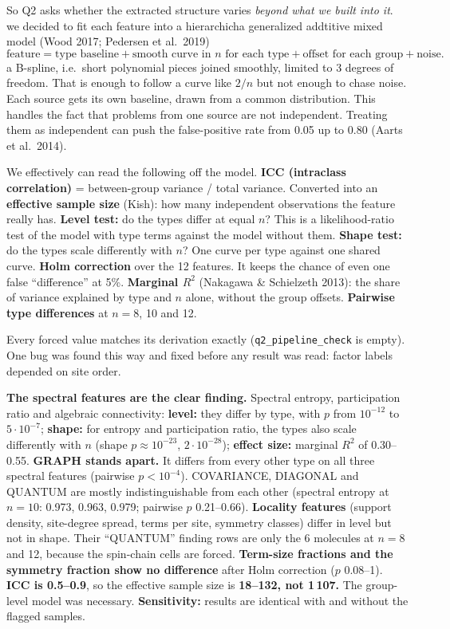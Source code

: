\documentclass[10pt,a4paper]{article}
\begin{document}
So Q2 asks whether the extracted structure varies \emph{beyond what we built
into it}. we decided to fit each feature into a hierarchicha generalized
addtitive mixed model (Wood 2017; Pedersen et al.\ 2019)
\[
\text{feature} = \text{type baseline} + \text{smooth curve in } n \text{ for each type} + \text{offset for each group} + \text{noise}.
\]
a B-spline, i.e.\ short polynomial pieces joined smoothly, limited to 3
degrees of freedom. That is enough to follow a curve like $2/n$ but not enough
to chase noise. Each source gets its own baseline, drawn from a common
distribution. This handles the fact that problems from one source are not
independent. Treating them as independent can push the false-positive rate
from 0.05 up to 0.80 (Aarts et al.\ 2014).

We effectively can read the following off the model.
\textbf{ICC (intraclass correlation)} = between-group variance /
total variance. Converted into an \textbf{effective sample size} (Kish):
how many independent observations the feature really has.
\textbf{Level test:} do the types differ at equal $n$? This is a
likelihood-ratio test of the model with type terms against the model without
them.
\textbf{Shape test:} do the types scale differently with $n$? One
curve per type against one shared curve.
\textbf{Holm correction} over the 12 features. It keeps the chance
of even one false ``difference'' at 5\%.
\textbf{Marginal $R^2$} (Nakagawa \& Schielzeth
2013): the share of variance explained by type and $n$ alone, without the
group offsets.
\textbf{Pairwise type differences} at $n = 8$, 10 and 12.

Every forced value matches its derivation exactly
(\texttt{q2\_pipeline\_check} is empty). One bug was found this way and
fixed before any result was read: factor labels depended on site order.

\textbf{The spectral features are the clear finding.} Spectral
entropy, participation ratio and algebraic connectivity:
\textbf{level:} they differ by type, with $p$ from $10^{-12}$ to $5\cdot10^{-7}$;
\textbf{shape:} for entropy and participation ratio, the types
also scale differently with $n$ (shape $p \approx 10^{-23}$, $2\cdot10^{-28}$);
\textbf{effect size:} marginal $R^2$ of 0.30--0.55.
\textbf{GRAPH stands apart.} It differs from every other type on all
three spectral features (pairwise $p < 10^{-4}$). COVARIANCE, DIAGONAL and QUANTUM
are mostly indistinguishable from each other (spectral entropy at $n=10$: 0.973,
0.963, 0.979; pairwise $p$ 0.21--0.66).
\textbf{Locality features} (support density, site-degree spread,
terms per site, symmetry classes) differ in level but not in shape. Their
``QUANTUM'' finding rows are only the 6 molecules at $n = 8$ and 12, because the
spin-chain cells are forced.
\textbf{Term-size fractions and the symmetry fraction show no
difference} after Holm correction ($p$ 0.08--1).
\textbf{ICC is 0.5--0.9}, so the effective sample size is
\textbf{18--132, not 1\,107.} The group-level model was necessary.
\textbf{Sensitivity:} results are identical with and without the
flagged samples.
\end{document}
